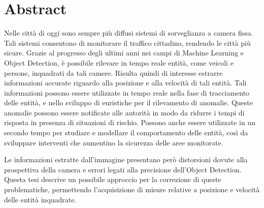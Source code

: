 \chapter*{Abstract}
Nelle città di oggi sono sempre più diffusi sistemi di sorveglianza a camera fissa.
Tali sistemi consentono di monitorare il traffico cittadino, rendendo le città più sicure.
Grazie al progresso degli ultimi anni nei campi di Machine Learning e Object Detection, è possibile rilevare in tempo reale entità, come veicoli e persone, inquadrati da tali camere.
Risulta quindi di interesse estrarre informazioni accurate riguardo alla posizione e alla velocità di tali entità. 
Tali informazioni possono essere utilizzate in tempo reale nella fase di tracciamento delle entità, e nello sviluppo di euristiche per il rilevamento di anomalie.
Queste anomalie possono essere notificate alle autorità in modo da ridurre i tempi di risposta in presenza di situazioni di rischio.
Possono anche essere utilizzate in un secondo tempo per studiare e modellare il comportamento delle entità, così da sviluppare interventi che aumentino la sicurezza delle aree monitorate.

Le informazioni estratte dall'immagine presentano però distorsioni dovute alla prospettiva della camera e errori legati alla precisione dell'Object Detection.
Questa tesi descrive un possibile approccio per la correzione di queste problematiche, permettendo l'acquisizione di misure relative a posizione e velocità delle entità inquadrate.

